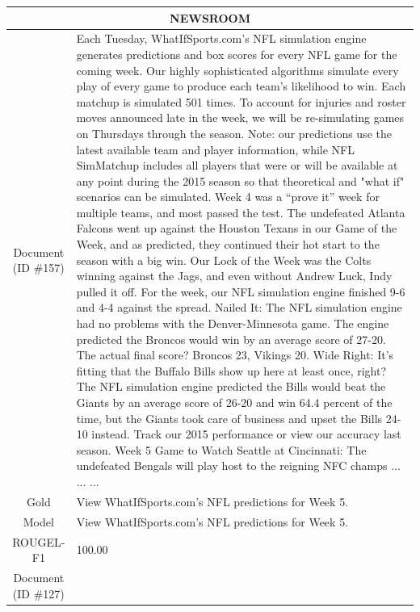 \begin{table}[bth!]
\scriptsize
\centering
\renewcommand{\arraystretch}{1.3}
\begin{tabular}{c|p{}}
\hline
\multicolumn{2}{c}{NEWSROOM} \\ \hline
\makecell{Document\\(ID \#157)} & 
Each Tuesday, WhatIfSports.com's NFL simulation engine generates predictions and box scores for every NFL game for the coming week. Our highly sophisticated algorithms simulate every play of every game to produce each team's likelihood to win. Each matchup is simulated 501 times. To account for injuries and roster moves announced late in the week, we will be re-simulating games on Thursdays through the season. Note: our predictions use the latest available team and player information, while NFL SimMatchup includes all players that were or will be available at any point during the 2015 season so that theoretical and "what if" scenarios can be simulated. Week 4 was a “prove it” week for multiple teams, and most passed the test. The undefeated Atlanta Falcons went up against the Houston Texans in our Game of the Week, and as predicted, they continued their hot start to the season with a big win. Our Lock of the Week was the Colts winning against the Jags, and even without Andrew Luck, Indy pulled it off. For the week, our NFL simulation engine finished 9-6 and 4-4 against the spread. Nailed It: The NFL simulation engine had no problems with the Denver-Minnesota game. The engine predicted the Broncos would win by an average score of 27-20. The actual final score? Broncos 23, Vikings 20. Wide Right: It’s fitting that the Buffalo Bills show up here at least once, right? The NFL simulation engine predicted the Bills would beat the Giants by an average score of 26-20 and win 64.4 percent of the time, but the Giants took care of business and upset the Bills 24-10 instead. Track our 2015 performance or view our accuracy last season. Week 5 Game to Watch Seattle at Cincinnati: The undefeated Bengals will play host to the reigning NFC champs ... ... ... 
\\ \hline
Gold & 
View WhatIfSports.com's NFL predictions for Week 5.
\\ \hline
Model & 
View WhatIfSports.com's NFL predictions for Week 5.
\\ \hline
ROUGEL-F1 & 
100.00
\\ \hline
\makecell{Document\\(ID \#127)} & 

\end{tabular}
\end{table}
